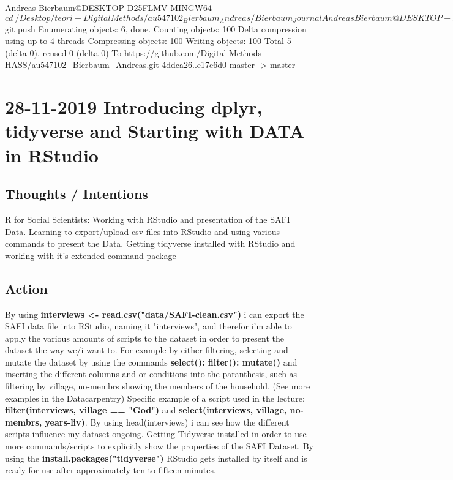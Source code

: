 \documentclass{article}
\begin{document}
Andreas Bierbaum@DESKTOP-D25FLMV MINGW64 ~
$ cd ~/Desktop/teori-DigitalMethods/au547102_Bierbaum_Andreas/Bierbaum_Journal


Andreas Bierbaum@DESKTOP-D25FLMV MINGW64 ~/Desktop/teori-DigitalMethods/au547102_Bierbaum_Andreas/Bierbaum_Journal (master)
$ git push
Enumerating objects: 6, done.
Counting objects: 100%
Delta compression using up to 4 threads
Compressing objects: 100%
Writing objects: 100%
Total 5 (delta 0), reused 0 (delta 0)
To https://github.com/Digital-Methods-HASS/au547102_Bierbaum_Andreas.git
   4ddca26..e17e6d0  master -> master

\newpage

\section{28-11-2019 Introducing dplyr, tidyverse and Starting with DATA in RStudio}
\subsection{Thoughts / Intentions}
R for Social Scientists: Working with RStudio and presentation of the SAFI Data.
Learning to export/upload csv files into RStudio and using various commands to present the Data.
Getting tidyverse installed with RStudio and working with it's extended command package
\subsection{Action}
By using \textbf{interviews <- read.csv("data/SAFI-clean.csv")} i can export the SAFI data file into RStudio, naming it "interviews", and therefor i'm able to apply the various amounts of scripts to the dataset in order to present the dataset the way we/i want to.
For example by either filtering, selecting and mutate the dataset by using the commands \textbf{select(): 
filter():  mutate()} and inserting the different columns and or conditions into the paranthesis, such as filtering by village, no-membrs showing the members of the household. (See more examples in the Datacarpentry) Specific example of a script used in the lecture: \textbf{filter(interviews, village == "God")} and \textbf{select(interviews, village, no-membrs, years-liv)}. By using head(interviews) i can see how the different scripts influence my dataset ongoing.
\newline 
Getting Tidyverse installed in order to use more commands/scripts to explicitly show the properties of the SAFI Dataset. By using the\textbf{ install.packages("tidyverse")} RStudio gets installed by itself and is ready for use after approximately ten to fifteen minutes. 
\end{document}
